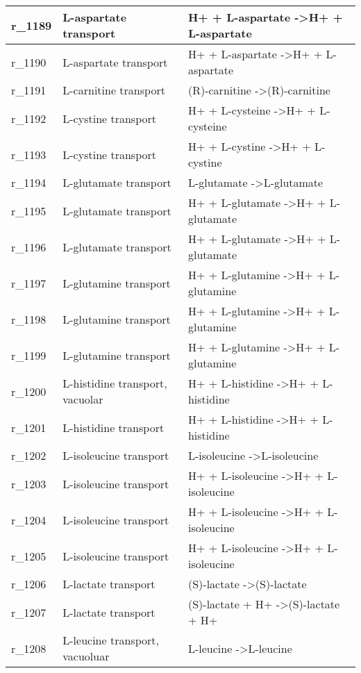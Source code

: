 \begin{landscape}
{\begin{longtable}{|l|p{7cm}|p{15cm}|}
r\_1189 & L-aspartate transport & H+ + L-aspartate  -\textgreater H+ + L-aspartate \\ \hline
r\_1190 & L-aspartate transport & H+ + L-aspartate  -\textgreater H+ + L-aspartate \\ \hline
r\_1191 & L-carnitine transport & (R)-carnitine  -\textgreater (R)-carnitine \\ \hline
r\_1192 & L-cystine transport & H+ + L-cysteine  -\textgreater H+ + L-cysteine \\ \hline
r\_1193 & L-cystine transport & H+ + L-cystine  -\textgreater H+ + L-cystine \\ \hline
r\_1194 & L-glutamate transport & L-glutamate  -\textgreater L-glutamate \\ \hline
r\_1195 & L-glutamate transport & H+ + L-glutamate  -\textgreater H+ + L-glutamate \\ \hline
r\_1196 & L-glutamate transport & H+ + L-glutamate  -\textgreater H+ + L-glutamate \\ \hline
r\_1197 & L-glutamine transport & H+ + L-glutamine  -\textgreater H+ + L-glutamine \\ \hline
r\_1198 & L-glutamine transport & H+ + L-glutamine  -\textgreater H+ + L-glutamine \\ \hline
r\_1199 & L-glutamine transport & H+ + L-glutamine  -\textgreater H+ + L-glutamine \\ \hline
r\_1200 & L-histidine transport, vacuolar & H+ + L-histidine  -\textgreater H+ + L-histidine \\ \hline
r\_1201 & L-histidine transport & H+ + L-histidine  -\textgreater H+ + L-histidine \\ \hline
r\_1202 & L-isoleucine transport & L-isoleucine  -\textgreater L-isoleucine \\ \hline
r\_1203 & L-isoleucine transport & H+ + L-isoleucine  -\textgreater H+ + L-isoleucine \\ \hline
r\_1204 & L-isoleucine transport & H+ + L-isoleucine  -\textgreater H+ + L-isoleucine \\ \hline
r\_1205 & L-isoleucine transport & H+ + L-isoleucine  -\textgreater H+ + L-isoleucine \\ \hline
r\_1206 & L-lactate transport & (S)-lactate  -\textgreater (S)-lactate \\ \hline
r\_1207 & L-lactate transport & (S)-lactate + H+  -\textgreater (S)-lactate + H+ \\ \hline
r\_1208 & L-leucine transport, vacuoluar & L-leucine  -\textgreater L-leucine \\ \hline

\end{longtable}}
\end{landscape}
